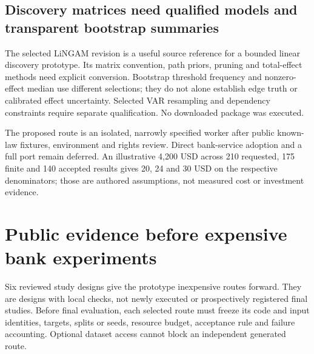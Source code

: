 \hypertarget{discovery-matrices-need-qualified-models-and-transparent-bootstrap-summaries}{%
\subsection{Discovery matrices need qualified models and transparent
bootstrap
summaries}\label{discovery-matrices-need-qualified-models-and-transparent-bootstrap-summaries}}

The selected LiNGAM revision is a useful source reference for a bounded
linear discovery prototype. Its matrix convention, path priors, pruning
and total-effect methods need explicit conversion. Bootstrap threshold
frequency and nonzero-effect median use different selections; they do
not alone establish edge truth or calibrated effect uncertainty.
Selected VAR resampling and dependency constraints require separate
qualification. No downloaded package was executed.
\citep{exec24_lingam_source,exec24_lingam_choice}

The proposed route is an isolated, narrowly specified worker after
public known-law fixtures, environment and rights review. Direct
bank-service adoption and a full port remain deferred. An illustrative
4,200 USD across 210 requested, 175 finite and 140 accepted results
gives 20, 24 and 30 USD on the respective denominators; those are
authored assumptions, not measured cost or investment
evidence.\citep{exec24_lingam_choice}

\hypertarget{public-evidence-before-expensive-bank-experiments}{%
\section{Public evidence before expensive bank
experiments}\label{public-evidence-before-expensive-bank-experiments}}

Six reviewed study designs give the prototype inexpensive routes
forward. They are designs with local checks, not newly executed or
prospectively registered final studies. Before final evaluation, each
selected route must freeze its code and input identities, targets,
splits or seeds, resource budget, acceptance rule and failure
accounting. Optional dataset access cannot block an independent
generated route. \citep{sp13_public}

